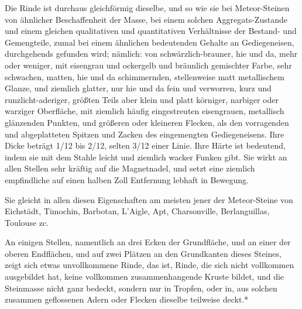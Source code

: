 \documentclass[a4paper, 11pt, oneside, german]{article}
\begin{document}
Die Rinde ist durchaus gleichförmig dieselbe, und so wie sie bei Meteor-Steinen von ähnlicher Beschaffenheit der Masse, bei einem solchen Aggregats-Zustande und einem gleichen qualitativen und quantitativen Verhältnisse der Bestand- und Gemengteile, zumal bei einem ähnlichen bedeutenden Gehalte an Gediegeneisen, durchgehends gefunden wird; nämlich: von schwärzlich-brauner, hie und da, mehr oder weniger, mit eisengrau und ockergelb und bräunlich gemischter Farbe, sehr schwachen, matten, hie und da schimmernden, stellenweise matt metallischem Glanze, und ziemlich glatter, nur hie und da fein und verworren, kurz und runzlicht-aderiger, größten Teils aber klein und platt körniger, narbiger oder warziger Oberfläche, mit ziemlich häufig eingestreuten eisengrauen, metallisch glänzenden Punkten, und größeren oder kleineren Flecken, als den vorragenden und abgeplatteten Spitzen und Zacken des eingemengten Gediegeneisens. Ihre Dicke beträgt 1/12 bis 2/12, selten 3/12 einer Linie. Ihre Härte ist bedeutend, indem sie mit dem Stahle leicht und ziemlich wacker Funken gibt. Sie wirkt an allen Stellen sehr kräftig auf die Magnetnadel, und setzt eine ziemlich empfindliche auf einen halben Zoll Entfernung lebhaft in Bewegung.

Sie gleicht in allen diesen Eigenschaften am meisten jener der Meteor-Steine von Eichstädt, Timochin, Barbotan, L'Aigle, Apt, Charsonville, Berlanguillas, Toulouse zc.

An einigen Stellen, namentlich an drei Ecken der Grundfläche, und an einer der oberen Endflächen, und auf zwei Plätzen an den Grundkanten dieses Steines, zeigt sich etwas unvollkommene Rinde, das ist, Rinde, die sich nicht vollkommen ausgebildet hat, keine vollkommen zusammenhangende Kruste bildet, und die Steinmasse nicht ganz bedeckt, sondern nur in Tropfen, oder in, aus solchen zusammen geflossenen Adern oder Flecken dieselbe teilweise deckt.*
\end{document}
